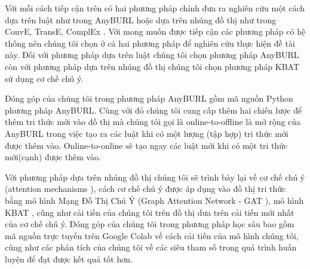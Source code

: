 Với mỗi cách tiếp cận trên có hai phương pháp chính đưa ra nghiên cứu một cách dựa trên luật như trong AnyBURL\cite{burl} hoặc dựa trên nhúng đồ thị như trong ConvE\cite{dettmers2017convolutional}, TransE\cite{bordes2013translating}, ComplEx \cite{trouillon2016complex}. Với mong muốn được tiếp cận các phương pháp có hệ thống nên chúng tôi chọn ở cả hai phương pháp để nghiên cứu thực hiện đề tài này. Đối với phương pháp dựa trên luật chúng tôi chọn phương pháp AnyBURL\cite{burl} còn với phương pháp dựa trên nhúng đồ thị chúng tôi chọn phương pháp KBAT \cite{nathani2019learning} sử dụng cơ chế chú  ý.

Đóng góp của chúng tôi trong phương pháp AnyBURL\cite{burl} gồm mã nguồn Python phương pháp AnyBURL. Cùng với đó chúng tôi cung cấp thêm hai chiến lược để thêm tri thức mới vào đồ thị mà chúng tôi gọi là online-to-offline là mở rộng của AnyBURL trong việc tạo ra các luật khi có một lượng (tập hợp) tri thức mới được thêm vào. Online-to-online sẽ tạo ngay các luật mới khi có một tri thức mới(cạnh) được thêm vào.

Với phương pháp dựa trên nhúng đồ thị chúng tôi sẽ trình bày lại về cơ chế chú ý (attention mechanisms \cite{vaswani2017attention}), cách cơ chế chú ý được áp dụng vào đồ thị tri thức bằng mô hình Mạng Đồ Thị Chú Ý (Graph Attention Network - GAT \cite{velivckovic2017graph}), mô hình KBAT \cite{nathani2019learning}, cũng như cải tiến của chúng tôi trên đồ thị dưa trên cải tiến mới nhất của cơ chế chú ý.
Đóng góp của chúng tôi trong phương pháp học sâu bao gồm mã nguồn trực tuyến trên Google Colab về cách cải tiến của mô hình chúng tôi, cũng như các phân tích của chúng tôi về các siêu tham số trong quá trình huấn luyện để đạt được kết quả tốt hơn.




